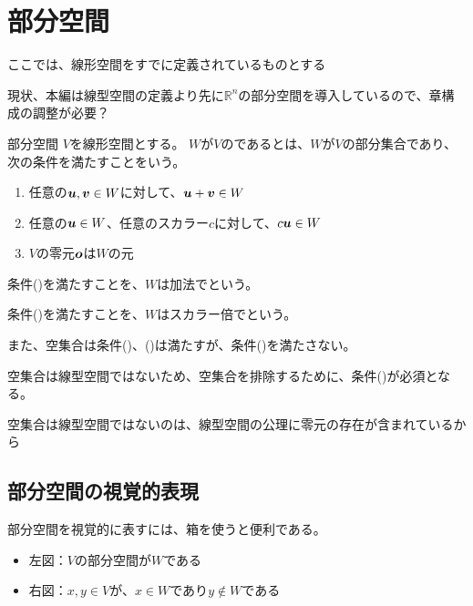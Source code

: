 \documentclass[../../../topic_linear-algebra]{subfiles}
\begin{document}
\sectionline
\section{部分空間}

\begin{mindflow}
  ここでは、線形空間をすでに定義されているものとする
  
  現状、本編は線型空間の定義より先に$\mathbb{R}^n$の部分空間を導入しているので、章構成の調整が必要？
\end{mindflow}

\begin{definition}{部分空間}
  $V$を線形空間とする。
  $W$が$V$のであるとは、$W$が$V$の部分集合であり、次の条件を満たすことをいう。
  \begin{enumerate}[label=\romanlabel]
    \item 任意の$\vb*{u}, \vb*{v} \in W$に対して、$\vb*{u} + \vb*{v} \in W$
    \item 任意の$\vb*{u} \in W$、任意のスカラー$c$に対して、$c \vb*{u} \in W$
    \item $V$の零元$\vb*{o}$は$W$の元
  \end{enumerate}
\end{definition}

条件()を満たすことを、$W$は加法でという。

条件()を満たすことを、$W$はスカラー倍でという。

\br

また、空集合は条件()、()は満たすが、条件()を満たさない。

空集合は線型空間ではないため、空集合を排除するために、条件()が必須となる。

\begin{mindflow}
  空集合は線型空間ではないのは、線型空間の公理に零元の存在が含まれているから
\end{mindflow}

\subsection{部分空間の視覚的表現}

部分空間を視覚的に表すには、箱を使うと便利である。

\begin{itemize}
  \item 左図：$V$の部分空間が$W$である
  \item 右図：$x, y \in V$が、$x \in W$であり$y \notin W$である
\end{itemize}
\end{document}
